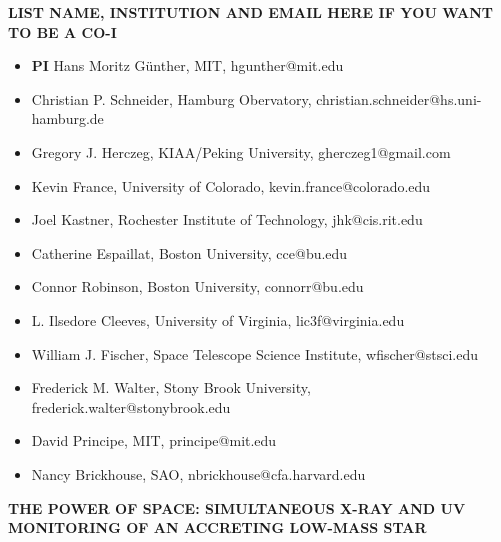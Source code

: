 \documentclass[letterpaper,11pt,twocolumn]{article}
\begin{document}
\onecolumn
\begin{center} 
\bfseries\uppercase{%
List name, institution and email here if you want to be a Co-I
}
\end{center}
\begin{itemize}
    \item \textbf{PI} Hans Moritz G\"unther, MIT, hgunther@mit.edu
    \item Christian P. Schneider, Hamburg Obervatory, christian.schneider@hs.uni-hamburg.de
\item Gregory J. Herczeg, KIAA/Peking University, gherczeg1@gmail.com
\item Kevin France, University of Colorado, kevin.france@colorado.edu
\item Joel Kastner, Rochester Institute of Technology, jhk@cis.rit.edu
\item Catherine Espaillat, Boston University, cce@bu.edu
\item Connor Robinson, Boston University, connorr@bu.edu
\item L. Ilsedore Cleeves, University of Virginia, lic3f@virginia.edu
\item William J. Fischer, Space Telescope Science Institute, wfischer@stsci.edu
\item Frederick M. Walter, Stony Brook University, frederick.walter@stonybrook.edu
\item David Principe, MIT, principe@mit.edu
\item Nancy Brickhouse, SAO, nbrickhouse@cfa.harvard.edu
\end{itemize}

\twocolumn


\pagestyle{plain}


 

\begin{center} 
\bfseries\uppercase{%
The power of space: Simultaneous X-ray and UV monitoring of an accreting
low-mass star
}
\end{center}



\end{document}
